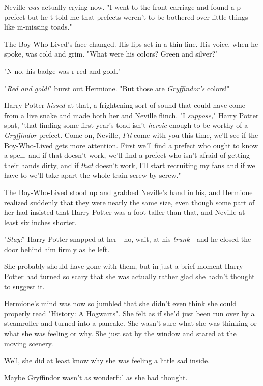 Neville \emph{was} actually crying now. "I went to the front carriage and found
a p-prefect but he t-told me that prefects weren't to be bothered over little
things like m-missing toads."

The Boy-Who-Lived's face changed. His lips set in a thin line. His voice, when
he spoke, was cold and grim. "What were his colors? Green and silver?"

"N-no, his badge was r-red and gold."

"\emph{Red and gold!}" burst out Hermione. "But those are \emph{Gryffindor's}
colors!"

Harry Potter \emph{hissed} at that, a frightening sort of sound that could have
come from a live snake and made both her and Neville flinch. "I
\emph{suppose,}" Harry Potter spat, "that finding some first-year's toad isn't
\emph{heroic} enough to be worthy of a \emph{Gryffindor} prefect. Come on,
Neville, \emph{I'll} come with you this time, we'll see if the Boy-Who-Lived
gets more attention. First we'll find a prefect who ought to know a spell, and
if that doesn't work, we'll find a prefect who isn't afraid of getting their
hands dirty, and if \emph{that} doesn't work, I'll start recruiting my fans and
if we have to we'll take apart the whole train screw by screw."

The Boy-Who-Lived stood up and grabbed Neville's hand in his, and Hermione
realized suddenly that they were nearly the same size, even
though some part of her had insisted that Harry Potter was a foot taller than
that, and Neville at least six inches shorter.

"\emph{Stay!}" Harry Potter snapped at her---no, wait, at his
\emph{trunk}---and he closed the door behind him firmly as he left.

She probably should have gone with them, but in just a brief moment Harry
Potter had turned so scary that she was actually rather glad she hadn't thought
to suggest it.

Hermione's mind was now so jumbled that she didn't even think she could
properly read "History: A Hogwarts". She felt as if she'd just been run over by
a steamroller and turned into a pancake. She wasn't sure what she was thinking
or what she was feeling or why. She just sat by the window and stared at the
moving scenery.

Well, she did at least know why she was feeling a little sad inside.

Maybe Gryffindor wasn't as wonderful as she had thought.
